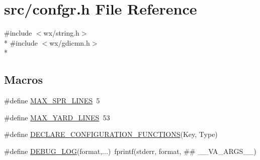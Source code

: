 \hypertarget{a00191}{\section{src/confgr.h File Reference}
\label{a00191}
}
{\ttfamily \#include $<$wx/string.\-h$>$}\\*
{\ttfamily \#include $<$wx/gdicmn.\-h$>$}\\*
\subsection*{Macros}
\begin{DoxyCompactItemize}
\item 
\#define \hyperlink{a00191_af967bcf8c2a02116db262bf1e1777a1a}{M\-A\-X\-\_\-\-S\-P\-R\-\_\-\-L\-I\-N\-E\-S}~5
\item 
\#define \hyperlink{a00191_ad80cbf96e4b808112d8433ff73da45a8}{M\-A\-X\-\_\-\-Y\-A\-R\-D\-\_\-\-L\-I\-N\-E\-S}~53
\item 
\#define \hyperlink{a00191_a4989137632e6ca4b4d209779ce6c17f9}{D\-E\-C\-L\-A\-R\-E\-\_\-\-C\-O\-N\-F\-I\-G\-U\-R\-A\-T\-I\-O\-N\-\_\-\-F\-U\-N\-C\-T\-I\-O\-N\-S}(Key, Type)
\item 
\#define \hyperlink{a00191_a580504d86e6d4ada0eea129fc88b777c}{D\-E\-B\-U\-G\-\_\-\-L\-O\-G}(format,...)~fprintf(stderr, format, \#\# \-\_\-\-\_\-\-V\-A\-\_\-\-A\-R\-G\-S\-\_\-\-\_\-)
\end{DoxyCompactItemize}
